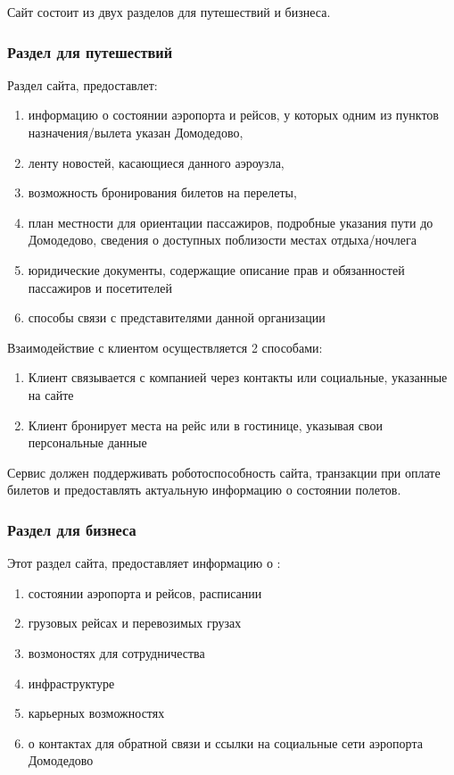 
Сайт состоит из двух разделов для путешествий и бизнеса.

\subsubsection{Раздел для путешествий}

Раздел сайта, предоставлет:
\begin{enumerate}
    \item информацию о состоянии аэропорта и рейсов,
          у которых одним из пунктов назначения/вылета
          указан Домодедово,
    \item ленту новостей, касающиеся данного аэроузла,
    \item возможность бронирования билетов на перелеты,
    \item план местности для ориентации пассажиров,
          подробные указания пути до Домодедово, сведения
          о доступных поблизости местах отдыха/ночлега
    \item юридические документы, содержащие описание
          прав и обязанностей пассажиров и посетителей
    \item способы связи с представителями данной
          организации
\end{enumerate}

Взаимодействие с клиентом осуществляется 2 способами:
\begin{enumerate}
    \item Клиент связывается с компанией через контакты
          или социальные, указанные на сайте
    \item Клиент бронирует места на рейс или в гостинице,
          указывая свои персональные данные
\end{enumerate}

Сервис должен поддерживать роботоспособность сайта,
транзакции при оплате билетов и предоставлять актуальную
информацию о состоянии полетов.

\subsubsection{Раздел для бизнеса}

Этот раздел сайта, предоставляет информацию о :
\begin{enumerate}
    \item состоянии аэропорта и рейсов, расписании
    \item грузовых рейсах и перевозимых грузах
    \item возмоностях для сотрудничества
    \item инфраструктуре
    \item карьерных возможностях
    \item о контактах для обратной связи и ссылки
          на социальные сети аэропорта Домодедово
\end{enumerate}
